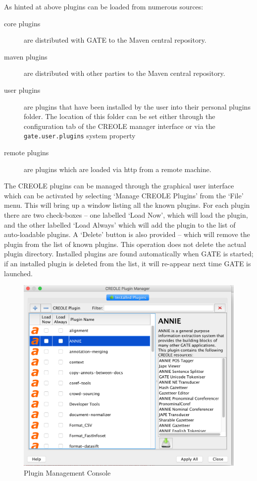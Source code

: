 As hinted at above plugins can be loaded from numerous sources:
\begin{description}
\item[core plugins] are distributed with GATE to the Maven central repository.
\item[maven plugins] are distributed with other parties to the Maven central repository.
\item[user plugins] are plugins that have been installed by the user into their
personal plugins folder. The location of this folder can be set either through the
configuration tab of the CREOLE manager interface or via the {\tt gate.user.plugins}
system property
\item[remote plugins] are plugins which are loaded via http from a remote machine.
\end{description}

The CREOLE plugins can be managed through the graphical user interface which can
be activated by selecting `Manage CREOLE Plugins' from the `File' menu. This
will bring up a window listing all the known plugins. For each plugin there are
two check-boxes -- one labelled `Load Now', which will load the plugin, and the
other labelled `Load Always' which will add the plugin to the list of
auto-loadable plugins. A `Delete' button is also provided -- which will remove
the plugin from the list of known plugins. This operation does not delete the 
actual plugin directory. Installed plugins are found automatically when GATE is
started; if an installed plugin is deleted from the list, it will re-appear next 
time GATE is launched.

\begin{figure}[htb]
\begin{center}
\includegraphics[width=14cm]{creole-manager85.png}
\end{center}
\caption{Plugin Management Console}
\label{fig:plugin-manager}
\end{figure}

